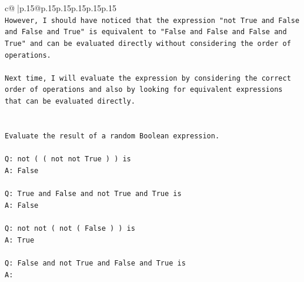 \documentclass{article}
\begin{document}
{\begin{supertabular}{c@{$\;$}|p{.15\linewidth}@{}p{.15\linewidth}p{.15\linewidth}p{.15\linewidth}p{.15\linewidth}p{.15\linewidth}}
{{{\\ 
\texttt{However, I should have noticed that the expression "not True and False and False and True" is equivalent to "False and False and False and True" and can be evaluated directly without considering the order of operations. } \\
\\ 
\texttt{Next time, I will evaluate the expression by considering the correct order of operations and also by looking for equivalent expressions that can be evaluated directly.} \\
\\ 
\\ 
\texttt{Evaluate the result of a random Boolean expression.} \\
\\ 
\texttt{Q: not ( ( not not True ) ) is} \\
\texttt{A: False} \\
\\ 
\texttt{Q: True and False and not True and True is} \\
\texttt{A: False} \\
\\ 
\texttt{Q: not not ( not ( False ) ) is} \\
\texttt{A: True} \\
\\ 
\texttt{Q: False and not True and False and True is} \\
\texttt{A:} \\
            }
        }
    }
     \\ \\


\end{supertabular}}
\end{document}
